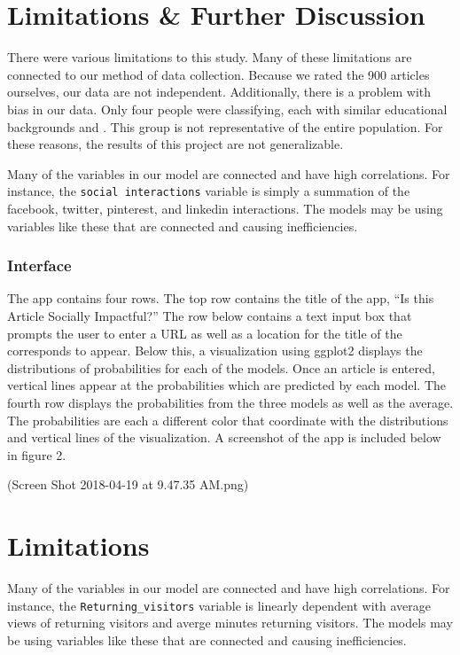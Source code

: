 \documentclass[10pt,letterpaper]{article}
\begin{document}
\section{Limitations \& Further
Discussion}\label{limitations-further-discussion}

There were various limitations to this study. Many of these limitations
are connected to our method of data collection. Because we rated the 900
articles ourselves, our data are not independent. Additionally, there is
a problem with bias in our data. Only four people were classifying, each
with similar educational backgrounds and . This group is not
representative of the entire population. For these reasons, the results
of this project are not generalizable.

Many of the variables in our model are connected and have high
correlations. For instance, the \texttt{social\ interactions} variable
is simply a summation of the facebook, twitter, pinterest, and linkedin
interactions. The models may be using variables like these that are
connected and causing inefficiencies.
\hypertarget{interface}{%
\subsubsection{Interface}\label{interface}}

The app contains four rows. The top row contains the title of the app,
``Is this Article Socially Impactful?'' The row below contains a text
input box that prompts the user to enter a URL as well as a location for
the title of the corresponds to appear. Below this, a visualization
using ggplot2 displays the distributions of probabilities for each of
the models. Once an article is entered, vertical lines appear at the
probabilities which are predicted by each model. The fourth row displays
the probabilities from the three models as well as the average. The
probabilities are each a different color that coordinate with the
distributions and vertical lines of the visualization. A screenshot of
the app is included below in figure 2.

(Screen Shot 2018-04-19 at 9.47.35 AM.png)

\hypertarget{limitations}{%
\section{Limitations}\label{limitations}}

Many of the variables in our model are connected and have high
correlations. For instance, the \texttt{Returning\_visitors} variable is
linearly dependent with average views of returning visitors and averge
minutes returning visitors. The models may be using variables like these
that are connected and causing inefficiencies.
\end{document}
